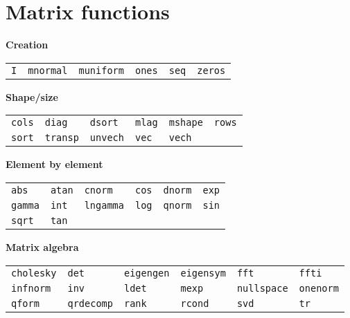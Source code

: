 \section{Matrix functions}
\label{matrix-func}

\begin{table}[htbp]
\centering
\textbf{Creation}
\hrulefill

\begin{tabular}{p{}p{}p{}p{}p{}p{}}
\texttt{I}         &
\texttt{mnormal}   &
\texttt{muniform}  &
\texttt{ones}      &
\texttt{seq}       &
\texttt{zeros}     
\end{tabular}      

\textbf{Shape/size}
\hrulefill

\begin{tabular}{p{}p{}p{}p{}p{}p{}}
\texttt{cols}      &
\texttt{diag}      &
\texttt{dsort}     &
\texttt{mlag}      &
\texttt{mshape}    &
\texttt{rows}      \\
\texttt{sort}      &
\texttt{transp}    &
\texttt{unvech}    &
\texttt{vec}       &
\texttt{vech}      
\end{tabular}      

\textbf{Element by element}
\hrulefill

\begin{tabular}{p{}p{}p{}p{}p{}p{}}
\texttt{abs}       &
\texttt{atan}      &
\texttt{cnorm}     &
\texttt{cos}       &
\texttt{dnorm}     &
\texttt{exp}       \\
\texttt{gamma}     &
\texttt{int}       &
\texttt{lngamma}   &
\texttt{log}       &
\texttt{qnorm}     &
\texttt{sin}       \\
\texttt{sqrt}      &
\texttt{tan}       
\end{tabular}      

\textbf{Matrix algebra}
\hrulefill

\begin{tabular}{p{}p{}p{}p{}p{}p{}}
\texttt{cholesky}  &
\texttt{det}       &
\texttt{eigengen}  &
\texttt{eigensym}  &
\texttt{fft}       &
\texttt{ffti}      \\
\texttt{infnorm}   &
\texttt{inv}       &
\texttt{ldet}      &
\texttt{mexp}      &
\texttt{nullspace} &
\texttt{onenorm}   \\
\texttt{qform}     &
\texttt{qrdecomp}  &
\texttt{rank}      &
\texttt{rcond}     &
\texttt{svd}       &
\texttt{tr}        
\end{tabular}      


\end{table}

